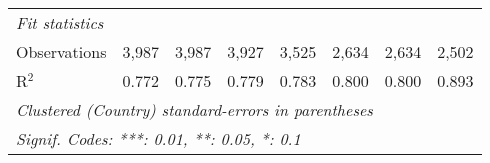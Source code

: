 \begin{table}[htbp]
\begin{tabular}{lccccccc}
      \midrule \emph{Fit statistics}\\
      Observations                                                      & 3,987   & 3,987   & 3,927        & 3,525         & 2,634          & 2,634          & 2,502\\  
      R$^2$                                                             & 0.772   & 0.775   & 0.779        & 0.783         & 0.800          & 0.800          & 0.893\\  
      \midrule
      \multicolumn{8}{l}{\emph{Clustered (Country) standard-errors in parentheses}}\\
      \multicolumn{8}{l}{\emph{Signif. Codes: ***: 0.01, **: 0.05, *: 0.1}}\\
   \end{tabular}
\end{table}



